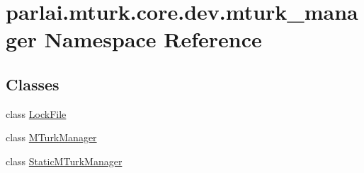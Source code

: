 \hypertarget{namespaceparlai_1_1mturk_1_1core_1_1dev_1_1mturk__manager}{}\section{parlai.\+mturk.\+core.\+dev.\+mturk\+\_\+manager Namespace Reference}
\label{namespaceparlai_1_1mturk_1_1core_1_1dev_1_1mturk__manager}
\subsection*{Classes}
\begin{DoxyCompactItemize}
\item 
class \hyperlink{classparlai_1_1mturk_1_1core_1_1dev_1_1mturk__manager_1_1LockFile}{Lock\+File}
\item 
class \hyperlink{classparlai_1_1mturk_1_1core_1_1dev_1_1mturk__manager_1_1MTurkManager}{M\+Turk\+Manager}
\item 
class \hyperlink{classparlai_1_1mturk_1_1core_1_1dev_1_1mturk__manager_1_1StaticMTurkManager}{Static\+M\+Turk\+Manager}
\end{DoxyCompactItemize}
